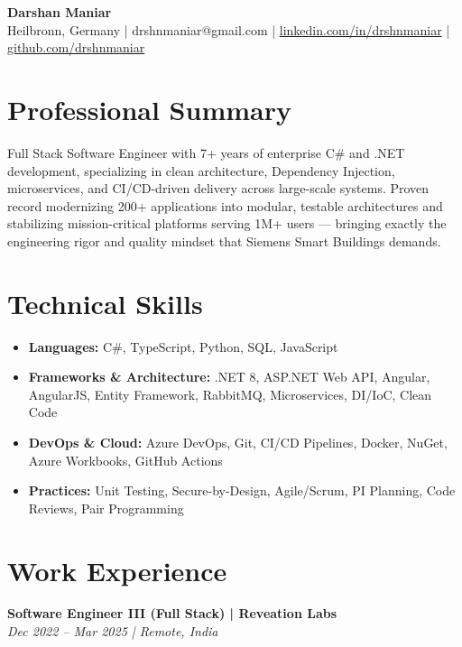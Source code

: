 \documentclass[letterpaper,10pt]{article}
\begin{document}
\begin{center}
{\Large \bfseries Darshan Maniar} \\ \vspace{2pt}
{\small Heilbronn, Germany | drshnmaniar@gmail.com | \href{https://linkedin.com/in/drshnmaniar}{linkedin.com/in/drshnmaniar} | \href{https://github.com/drshnmaniar}{github.com/drshnmaniar}}
\end{center}


\section{Professional Summary}
{\small Full Stack Software Engineer with 7+ years of enterprise C\# and .NET development, specializing in clean architecture, Dependency Injection, microservices, and CI/CD-driven delivery across large-scale systems. Proven record modernizing 200+ applications into modular, testable architectures and stabilizing mission-critical platforms serving 1M+ users — bringing exactly the engineering rigor and quality mindset that Siemens Smart Buildings demands.}


\section{Technical Skills}
\begin{itemize}[leftmargin=0.15in,topsep=2pt,itemsep=2pt,parsep=0pt]
\item\small{\textbf{Languages:} C\#, TypeScript, Python, SQL, JavaScript}
\item\small{\textbf{Frameworks \& Architecture:} .NET 8, ASP.NET Web API, Angular, AngularJS, Entity Framework, RabbitMQ, Microservices, DI/IoC, Clean Code}
\item\small{\textbf{DevOps \& Cloud:} Azure DevOps, Git, CI/CD Pipelines, Docker, NuGet, Azure Workbooks, GitHub Actions}
\item\small{\textbf{Practices:} Unit Testing, Secure-by-Design, Agile/Scrum, PI Planning, Code Reviews, Pair Programming}
\end{itemize}


\section{Work Experience}

\noindent\textbf{Software Engineer III (Full Stack) | Reveation Labs}\\
{\small\textit{Dec 2022 – Mar 2025 | Remote, India}}\\[-2pt]
\end{document}
